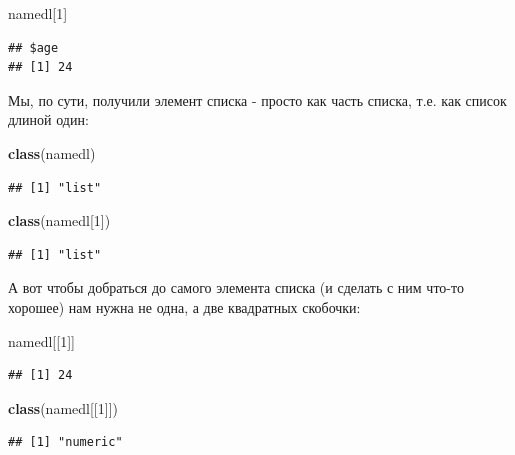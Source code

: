 \documentclass[]{book}
\newenvironment{Shaded}{\begin{snugshade}}{\end{snugshade}}
\newcommand{\DecValTok}[1]{\textcolor[rgb]{0.00,0.00,0.81}{#1}}
\newcommand{\KeywordTok}[1]{\textcolor[rgb]{0.13,0.29,0.53}{\textbf{#1}}}
\newcommand{\NormalTok}[1]{#1}
\begin{document}
\begin{Shaded}
\begin{Highlighting}[]
\NormalTok{namedl[}\DecValTok{1}\NormalTok{]}
\end{Highlighting}
\end{Shaded}

\begin{verbatim}
## $age
## [1] 24
\end{verbatim}

Мы, по сути, получили элемент списка - просто как часть списка, т.е. как список длиной один:

\begin{Shaded}
\begin{Highlighting}[]
\KeywordTok{class}\NormalTok{(namedl)}
\end{Highlighting}
\end{Shaded}

\begin{verbatim}
## [1] "list"
\end{verbatim}

\begin{Shaded}
\begin{Highlighting}[]
\KeywordTok{class}\NormalTok{(namedl[}\DecValTok{1}\NormalTok{])}
\end{Highlighting}
\end{Shaded}

\begin{verbatim}
## [1] "list"
\end{verbatim}

А вот чтобы добраться до самого элемента списка (и сделать с ним что-то хорошее) нам нужна не одна, а две квадратных скобочки:

\begin{Shaded}
\begin{Highlighting}[]
\NormalTok{namedl[[}\DecValTok{1}\NormalTok{]]}
\end{Highlighting}
\end{Shaded}

\begin{verbatim}
## [1] 24
\end{verbatim}

\begin{Shaded}
\begin{Highlighting}[]
\KeywordTok{class}\NormalTok{(namedl[[}\DecValTok{1}\NormalTok{]])}
\end{Highlighting}
\end{Shaded}

\begin{verbatim}
## [1] "numeric"
\end{verbatim}
\end{document}
